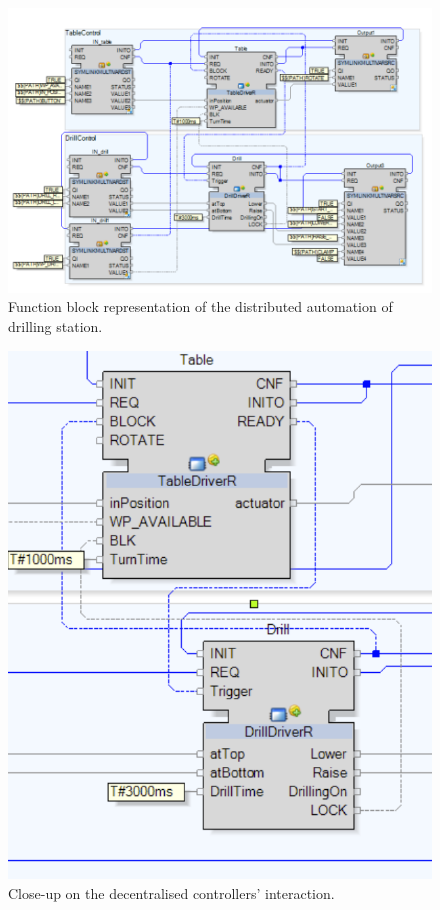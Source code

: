 \begin{bibunit}
\begin{figure}[h]
    \centering
    \includegraphics[scale = 0.4]{MX_Papers/Paper2/images/fig2updated.PNG}
    \caption{Function block representation of the distributed automation of drilling station.}
    \label{figure:RealFBDiagram}
\end{figure}

\begin{figure}[h]
    \centering
    \includegraphics[scale = 0.20]{MX_Papers/Paper2/images/DT_REAL_FB_CONTROLLERS.png}
    \caption{Close-up on the decentralised controllers' interaction.}
    \label{figure:RealFBControllers}
\end{figure}


\end{bibunit}
